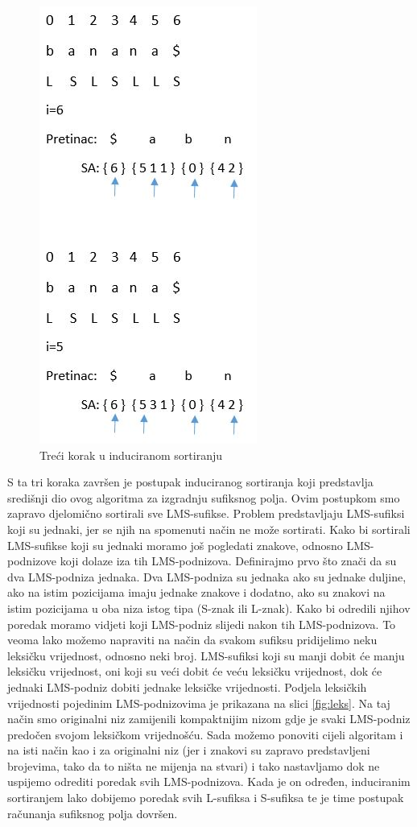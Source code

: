 \begin{figure}[H]
   \centering
       \includegraphics{./pictures/SAISstep3.jpg}
 \caption{Treći korak u induciranom sortiranju}
 \label{fig:sais3}
\end{figure}

S ta tri koraka završen je postupak induciranog sortiranja koji predstavlja središnji dio ovog algoritma za izgradnju sufiksnog polja. Ovim postupkom smo zapravo djelomično sortirali sve LMS-sufikse. Problem predstavljaju LMS-sufiksi koji su jednaki, jer se njih na spomenuti način ne može sortirati. Kako bi sortirali LMS-sufikse koji su jednaki moramo još pogledati znakove, odnosno LMS-podnizove koji dolaze iza tih LMS-podnizova. Definirajmo prvo što znači da su dva LMS-podniza jednaka. Dva LMS-podniza su jednaka ako su jednake duljine, ako na istim pozicijama imaju jednake znakove i dodatno, ako su znakovi na istim pozicijama u oba niza istog tipa (S-znak ili L-znak). Kako bi odredili njihov poredak moramo vidjeti koji LMS-podniz slijedi nakon tih LMS-podnizova. To veoma lako možemo napraviti na način da svakom sufiksu pridijelimo neku leksičku vrijednost, odnosno neki broj. LMS-sufiksi koji su manji dobit će manju leksičku vrijednost, oni koji su veći dobit će veću leksičku vrijednost, dok će jednaki LMS-podniz dobiti jednake leksičke vrijednosti. Podjela leksičkih vrijednosti pojedinim LMS-podnizovima je prikazana na slici \ref{fig:leks}. Na taj način smo originalni niz zamijenili kompaktnijim nizom gdje je svaki LMS-podniz predočen svojom leksičkom vrijednošću. Sada možemo ponoviti cijeli algoritam i na isti način kao i za originalni niz (jer i znakovi su zapravo predstavljeni brojevima, tako da to ništa ne mijenja na stvari) i tako nastavljamo dok ne uspijemo odrediti poredak svih LMS-podnizova. Kada je on određen, induciranim sortiranjem lako dobijemo poredak svih L-sufiksa i S-sufiksa te je time postupak računanja sufiksnog polja dovršen.

